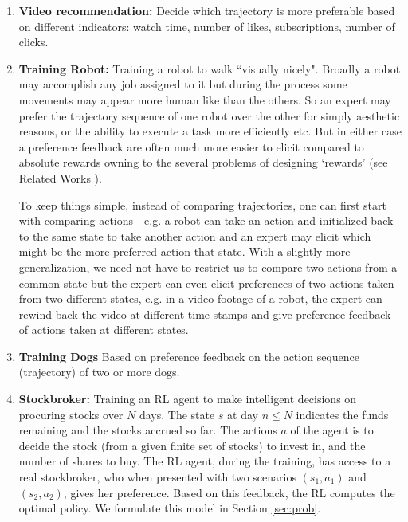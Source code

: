 \begin{enumerate}
	\item \textbf{Video recommendation:} Decide which trajectory is more preferable based on different indicators: watch time, number of likes, subscriptions, number of clicks.  

	\item \textbf{Training Robot:} Training a robot to walk ``visually nicely". Broadly a robot may accomplish any job assigned to it but during the process some movements may appear more human like than the others. So an expert may prefer the trajectory sequence of one robot over the other for simply aesthetic reasons, or the ability to execute a task more efficiently etc. But in either case a preference feedback are often much more easier to elicit compared to absolute rewards owning to the several problems of designing `rewards' (see Related Works \cite{wirth17}).

	To keep things simple, instead of comparing trajectories, one can first start with comparing actions---e.g. a robot can take an action and initialized back to the same state to take another action and an expert may elicit which might be the more preferred action that state. With a slightly more generalization, we need not have to restrict us to compare two actions from a common state but the expert can even elicit preferences of two actions taken from two different states, e.g. in a video footage of a robot, the expert can rewind back the video at different time stamps and give preference feedback of actions taken at different states.

	\item \textbf{Training Dogs} Based on preference feedback on the action sequence (trajectory) of two or more dogs.

	\item \textbf{Stockbroker:} Training an RL agent to make intelligent decisions on procuring stocks over $N$ days. The state $s$ at day $n \leq N$ indicates the funds remaining and the stocks accrued so far. The actions $a$ of the agent is to decide the stock (from a given finite set of stocks) to invest in, and the number of shares to buy. The RL agent, during the training, has access to a real stockbroker, who when presented with two scenarios $(s_1,a_1)$ and $(s_2,a_2)$, gives her preference. Based on this feedback, the RL computes the optimal policy. We formulate this model in Section \ref{sec:prob}. 
\end{enumerate}

\fi 

